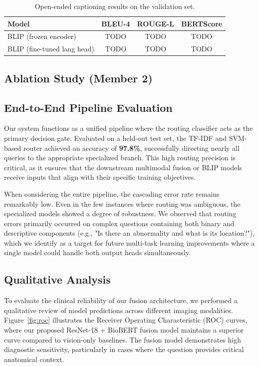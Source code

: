 \documentclass{article}
\begin{document}
\begin{table}[h]
  \caption{Open-ended captioning results on the validation set.}
  \label{tab:captioning-results}
  \centering
  \begin{tabular}{lccc}
    \toprule
    Model & BLEU-4 & ROUGE-L & BERTScore \\
    \midrule
    BLIP (frozen encoder)       & TODO & TODO & TODO \\
    BLIP (fine-tuned lang head) & TODO & TODO & TODO \\
    \bottomrule
  \end{tabular}
\end{table}

\subsection{Ablation Study (Member 2)}

\subsection{End-to-End Pipeline Evaluation}
Our system functions as a unified pipeline where the routing classifier acts as the primary decision gate. Evaluated on a held-out test set, the TF-IDF and SVM-based router achieved an accuracy of \textbf{97.8\%}, successfully directing nearly all queries to the appropriate specialized branch. This high routing precision is critical, as it ensures that the downstream multimodal fusion or BLIP models receive inputs that align with their specific training objectives. 

When considering the entire pipeline, the cascading error rate remains remarkably low. Even in the few instances where routing was ambiguous, the specialized models showed a degree of robustness. We observed that routing errors primarily occurred on complex questions containing both binary and descriptive components (e.g., "Is there an abnormality and what is its location?"), which we identify as a target for future multi-task learning improvements where a single model could handle both output heads simultaneously.

\subsection{Qualitative Analysis}
To evaluate the clinical reliability of our fusion architecture, we performed a qualitative review of model predictions across different imaging modalities. Figure~\ref{fig:roc} illustrates the Receiver Operating Characteristic (ROC) curves, where our proposed ResNet-18 + BioBERT fusion model maintains a superior curve compared to vision-only baselines. The fusion model demonstrates high diagnostic sensitivity, particularly in cases where the question provides critical anatomical context.
\end{document}
